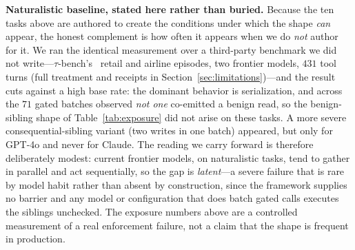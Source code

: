 \documentclass[10pt,journal,compsoc]{IEEEtran}
\begin{document}
\smallskip\noindent\textbf{Naturalistic baseline, stated here rather than
buried.} Because the ten tasks above are authored to create the conditions
under which the shape \emph{can} appear, the honest complement is how often it
appears when we do \emph{not} author for it. We ran the identical measurement
over a third-party benchmark we did not write---$\tau$-bench's~\cite{taubench24}
retail and airline episodes, two frontier models, $431$ tool turns
(full treatment and receipts in Section~\ref{sec:limitations})---and the
result cuts against a high base rate: the dominant behavior is serialization,
and across the $71$ gated batches observed \emph{not one} co-emitted a benign
read, so the benign-sibling shape of Table~\ref{tab:exposure} did not arise on
these tasks. A more severe consequential-sibling variant (two writes in one
batch) appeared, but only for GPT-4o and never for Claude. The reading we
carry forward is therefore deliberately modest: current frontier models, on
naturalistic tasks, tend to gather in parallel and act sequentially, so the
gap is \emph{latent}---a severe failure that is rare by model habit rather
than absent by construction, since the framework supplies no barrier and any
model or configuration that does batch gated calls executes the siblings
unchecked. The exposure numbers above are a controlled measurement of a real
enforcement failure, not a claim that the shape is frequent in production.
\end{document}
